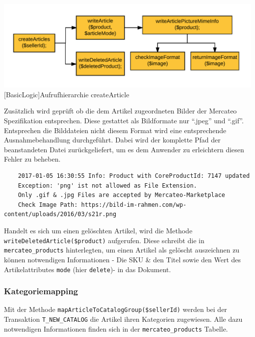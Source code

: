 		\begin{minipage}{\linewidth}
			\vspace{1em}
			\centering
			\includegraphics[width=0.7 \linewidth]{img/createArticleHierarchie}
			[BasicLogic]{Aufrufhierarchie createArticle}
			\vspace{1em}
		\end{minipage}
	
	Zusätzlich wird geprüft ob die dem Artikel zugeordneten Bilder der Mercateo Spezifikation entsprechen. Diese gestattet als Bildformate nur \enquote{.jpeg} und \enquote{.gif}. Entsprechen die Bilddateien nicht diesem Format wird eine entsprechende Ausnahmebehandlung durchgeführt. Dabei wird der komplette Pfad der beanstandeten Datei zurückgeliefert, um es dem Anwender zu erleichtern diesen Fehler zu beheben.\\
	
	\begin{lstlisting}
	2017-01-05 16:30:55 Info: Product with CoreProductId: 7147 updated
	Exception: 'png' ist not allowed as File Extension.
	Only .gif & .jpg Files are accepted by Mercateo-Marketplace
	Check Image Path: https://bild-im-rahmen.com/wp-content/uploads/2016/03/s21r.png
	\end{lstlisting}

	Handelt es sich um einen gelöschten Artikel, wird die Methode \texttt{writeDeletedArticle(\$pro\-duct)} aufgerufen. Diese schreibt die in \texttt{mercateo\_products} hinterlegten, um einen Artikel als gelöscht auszeichnen zu können notwendigen Informationen - Die SKU \& den Titel sowie den Wert des Artikelattributes \texttt{mode} (hier \texttt{delete})- in das Dokument.
	
	\subsubsection{Kategoriemapping}
	
	Mit der Methode \texttt{mapArticleToCatalogGroup(\$sellerId)} werden bei der Transaktion \texttt{T\_NEW\_CATALOG} die Artikel ihren Kategorien zugewiesen. Alle dazu notwendigen Informationen finden sich in der \texttt{mercateo\_products} Tabelle.
	
